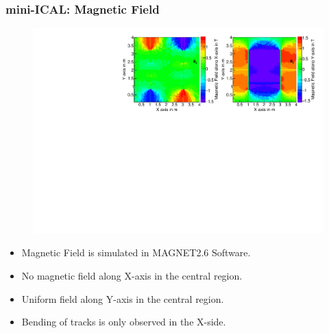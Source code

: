 \documentclass{beamer}
\begin{document}
\begin{frame}
  \frametitle{mini-ICAL: Magnetic Field}
  \vspace*{-5pt}
  \begin{figure}[h!]
    \includegraphics[width=1.0\linewidth]{mag_field_mICAL.pdf}
  \end{figure}
  \vspace*{-5pt}
  \begin{itemize} %
  \item Magnetic Field is simulated in MAGNET2.6 Software.
  \item No magnetic field along X-axis in the central region.
  \item Uniform field along Y-axis in the central region.
  \item Bending of tracks is only observed in the X-side.
  \end{itemize}
\end{frame}
\end{document}
